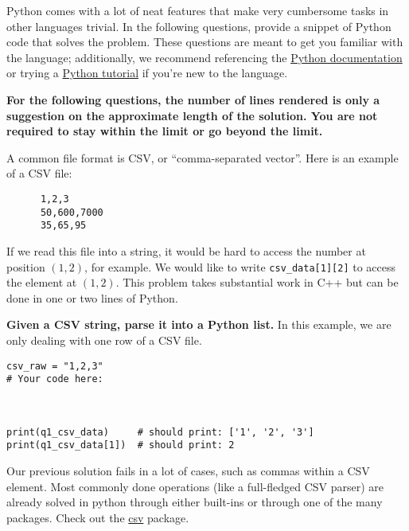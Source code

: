 \documentclass{article}
\begin{document}
Python comes with a lot of neat features that make very cumbersome tasks in other languages trivial. In the following questions, provide a snippet of Python code that solves the problem. These questions are meant to get you familiar with the language; additionally, we recommend referencing the \href{https://docs.python.org/3/}{Python documentation} or trying a \href{http://www.learnpython.org/}{Python tutorial} if you're new to the language. 

\textbf{For the following questions, the number of lines rendered is only a suggestion on the approximate length of the solution. You are not required to stay within the limit or go beyond the limit.}
\begin{enumerate}

\begin{minipage}{\textwidth}
    \item A common file format is CSV, or ``comma-separated vector''. Here is an example of a CSV file:
  
    \begin{verbatim}
      1,2,3
      50,600,7000
      35,65,95\end{verbatim}
  
    If we read this file into a string, it would be hard to access the number at position $(1, 2)$, for example. We would like to write \texttt{csv\_data[1][2]} to access the element at $(1, 2)$. This problem takes substantial work in C++ but can be done in one or two lines of Python.
  
    \textbf{Given a CSV string, parse it into a Python list.} In this example, we are only dealing with one row of a CSV file.
    \begin{lstlisting}[style=Python]
csv_raw = "1,2,3"
# Your code here:



print(q1_csv_data)     # should print: ['1', '2', '3']
print(q1_csv_data[1])  # should print: 2
    \end{lstlisting}
\end{minipage}

\begin{minipage}{\textwidth}
    \item Our previous solution fails in a lot of cases, such as commas within a CSV element. Most commonly done operations (like a full-fledged CSV parser) are already solved in python through either built-ins or through one of the many packages. Check out the \href{https://docs.python.org/2/library/csv.html}{csv} package.


\end{minipage}
\end{enumerate}
\end{document}

